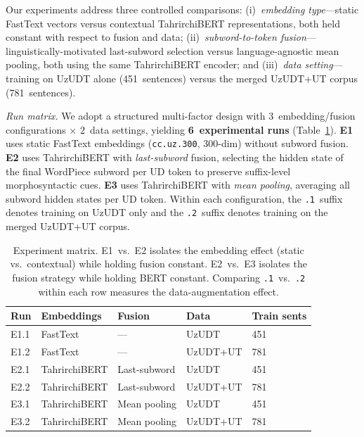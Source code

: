 \documentclass[runningheads]{llncs}
\begin{document}
Our experiments address three controlled comparisons:
(i)~\emph{embedding type}---static FastText vectors versus contextual TahrirchiBERT representations, both held constant with respect to fusion and data;
(ii)~\emph{subword-to-token fusion}---linguistically-motivated last-subword selection versus language-agnostic mean pooling, both using the same TahrirchiBERT encoder;
and (iii)~\emph{data setting}---training on UzUDT alone (451~sentences) versus the merged UzUDT+UT corpus (781~sentences).

\textit{Run matrix.}
We adopt a structured multi-factor design with $3$~embedding/fusion configurations $\times$ $2$~data settings, yielding \textbf{6~experimental runs} (Table~\ref{tab:matrix}).
\textbf{E1} uses static FastText embeddings (\texttt{cc.uz.300}, 300-dim) without subword fusion.
\textbf{E2} uses TahrirchiBERT with \emph{last-subword} fusion, selecting the hidden state of the final WordPiece subword per UD token to preserve suffix-level morphosyntactic cues.
\textbf{E3} uses TahrirchiBERT with \emph{mean pooling}, averaging all subword hidden states per UD token.
Within each configuration, the \texttt{.1}~suffix denotes training on UzUDT only and the \texttt{.2}~suffix denotes training on the merged UzUDT+UT corpus.

\begin{table}[t]
\centering
\small
\begin{tabular*}{\textwidth}{@{\extracolsep{\fill}}lllll@{}}
\toprule
\textbf{Run} & \textbf{Embeddings} & \textbf{Fusion} & \textbf{Data} & \textbf{Train sents} \\
\midrule
E1.1 & FastText  & ---           & UzUDT      & 451 \\
E1.2 & FastText  & ---           & UzUDT+UT   & 781 \\
E2.1 & TahrirchiBERT & Last-subword  & UzUDT      & 451 \\
E2.2 & TahrirchiBERT & Last-subword  & UzUDT+UT   & 781 \\
E3.1 & TahrirchiBERT & Mean pooling  & UzUDT      & 451 \\
E3.2 & TahrirchiBERT & Mean pooling  & UzUDT+UT   & 781 \\
\bottomrule
\end{tabular*}
\caption{Experiment matrix.
E1~vs.\ E2 isolates the embedding effect (static vs.\ contextual) while holding fusion constant.
E2~vs.\ E3 isolates the fusion strategy while holding BERT constant.
Comparing \texttt{.1}~vs.\ \texttt{.2} within each row measures the data-augmentation effect.}
\label{tab:matrix}
\end{table}
\end{document}
